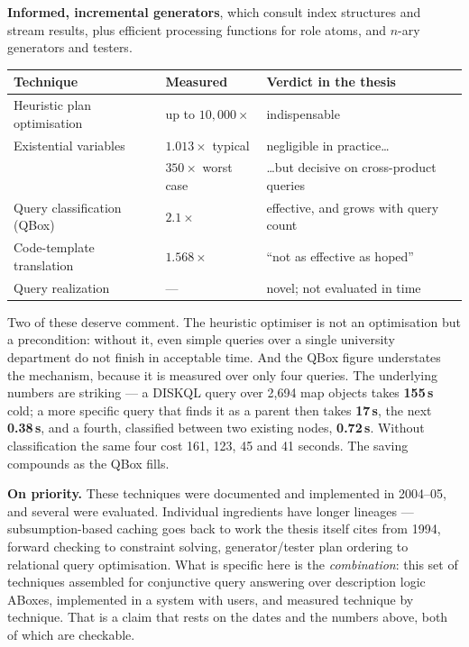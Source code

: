\documentclass[11pt,a4paper,DIV=12,parskip=half]{scrartcl}
\newenvironment{note}
  {\begin{list}{}{\setlength{\leftmargin}{1.5em}\setlength{\rightmargin}{1.5em}%
                  \setlength{\listparindent}{0pt}}\item[]\small}
  {\end{list}}
\begin{document}
\textbf{Informed, incremental generators}, which consult index structures and
stream results, plus efficient processing functions for role atoms, and $n$-ary
generators and testers.

\begin{center}
\small
\begin{tabular}{@{}lll@{}}
\toprule
\textbf{Technique} & \textbf{Measured} & \textbf{Verdict in the thesis} \\
\midrule
Heuristic plan optimisation & up to $10{,}000\times$ & indispensable \\
Existential variables & $1.013\times$ typical & negligible in practice… \\
 & $350\times$ worst case & …but decisive on cross-product queries \\
Query classification (QBox) & $2.1\times$ & effective, and grows with query count \\
Code-template translation & $1.568\times$ & \enquote{not as effective as hoped} \\
Query realization & --- & novel; not evaluated in time \\
\bottomrule
\end{tabular}
\end{center}

Two of these deserve comment. The heuristic optimiser is not an optimisation but
a precondition: without it, even simple queries over a single university
department do not finish in acceptable time. And the QBox figure understates the
mechanism, because it is measured over only four queries. The underlying numbers
are striking --- a DISKQL query over 2,694 map objects takes \textbf{155\,s}
cold; a more specific query that finds it as a parent then takes \textbf{17\,s},
the next \textbf{0.38\,s}, and a fourth, classified between two existing nodes,
\textbf{0.72\,s}. Without classification the same four cost 161, 123, 45 and 41
seconds. The saving compounds as the QBox fills.

\begin{note}
\textbf{On priority.} These techniques were documented and implemented in
2004--05, and several were evaluated. Individual ingredients have longer
lineages --- subsumption-based caching goes back to work the thesis itself cites
from 1994, forward checking to constraint solving, generator/tester plan
ordering to relational query optimisation. What is specific here is the
\emph{combination}: this set of techniques assembled for conjunctive query
answering over description logic ABoxes, implemented in a system with users, and
measured technique by technique. That is a claim that rests on the dates and the
numbers above, both of which are checkable.
\end{note}
\end{document}
